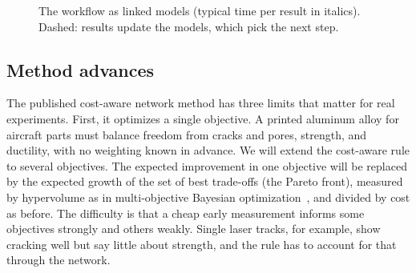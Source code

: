 \documentclass[12pt,letterpaper]{article}
\begin{document}
\begin{figure}[t]
\centering
{}  %
\caption{The workflow as linked models (typical time per result in
italics). Dashed: results update the models, which pick the next step.}
\label{fig:network}
\end{figure}

\subsection{Method advances}
The published cost-aware network method has three limits that matter for
real experiments. First, it optimizes a
single objective. A printed aluminum alloy for aircraft parts must balance
freedom from cracks and pores, strength, and ductility, with no weighting
known in advance. We will
extend the cost-aware rule to several objectives. The expected improvement in
one objective will be replaced by the expected growth of the set of best
trade-offs (the Pareto front), measured by hypervolume as in multi-objective
Bayesian optimization~\cite{daulton2021}, and divided by cost as before. The
difficulty is that a cheap early measurement informs some objectives strongly
and others weakly. Single laser tracks, for example, show cracking well but
say little about strength, and the rule has to account for that through
the network.
\end{document}
